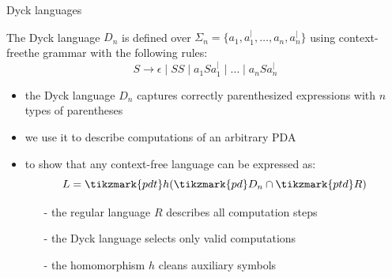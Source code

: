 \documentclass[handout]{beamer}
\begin{document}
\begin{frame}{Dyck languages}

    \begin{definition}
        The \alert{Dyck language} $D_n$ is defined over $\Sigma_n=\{a_1, a^|_1,\ldots,a_n, a^|_n\}$ using context-freethe grammar with the following rules: 
        $$
        S\rightarrow \epsilon\mid SS\mid a_1Sa_1^| \mid \ldots \mid a_nSa_n^|
        $$
    \end{definition}  
    \vspace{-6pt}      
    \begin{itemize}
        \item the Dyck language $D_n$ captures correctly parenthesized expressions with $n$ types of parentheses
        \item we use it to describe computations of an arbitrary PDA
        \item to show that any context-free language can be expressed as:
        $$
        L = \tikzmark{pdt}h(\tikzmark{pd}D_n\cap \tikzmark{ptd}R)
        $$
        \vspace{-12pt}
        \begin{itemize}
            \item[-] the regular language $R$ describes all computation steps
            \item[-] the Dyck language selects only valid computations
            \item[-] the homomorphism $h$ cleans auxiliary symbols
        \end{itemize}
    \end{itemize}
    
\end{frame}
\end{document}
